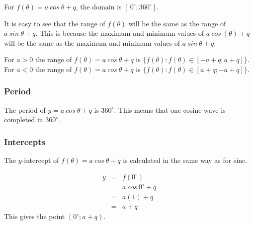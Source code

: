 For $f(\theta )=a~cos ~\theta +q$, the domain is $[~0^{\circ}; 360^{\circ}]$.\par 
It is easy to see that the range of $f(\theta )$ will be the same as the range of $a~sin~\theta+q$. This is because the maximum and minimum values of $a~cos ~(\theta )+q$ will be the same as the maximum and minimum values of $a~sin~\theta+q$.\\
\par
For $a>0$ the range of $f(\theta)=a~cos ~\theta+q$ is $\{f(\theta): f(\theta) \in [-a+q; a+q]\}$. \\
For $a<0$ the range of $f(\theta)=a~cos ~\theta+q$ is $\{f(\theta): f(\theta) \in [a+q; -a+q]\}$.
\subsubsection*{Period}
The period of $y=a~cos ~\theta+q$ is $360^{\circ}$. This means that one cosine wave is completed in $360^{\circ}$. 

\subsubsection*{Intercepts}
\nopagebreak
The $y$-intercept of $f(\theta )=a~cos ~\theta+q$ is calculated in the same way as for sine.\par 
\nopagebreak\noindent{}
\begin{eqnarray*}
  y &=& f({0}^{\circ}) \\
    &=& a~cos ~ 0^{\circ } + q \\
    &=& a(1) + q \\
    &=& a + q
\end{eqnarray*}
This gives the point $(0^{\circ};a+q)$.

